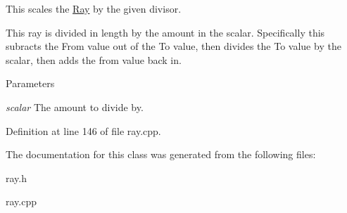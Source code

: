 This scales the \hyperlink{classphys_1_1Ray}{Ray} by the given divisor. 

This ray is divided in length by the amount in the scalar. Specifically this subracts the From value out of the To value, then divides the To value by the scalar, then adds the from value back in. 
\begin{DoxyParams}{Parameters}
\item[{\em scalar}]The amount to divide by. \end{DoxyParams}


Definition at line 146 of file ray.cpp.



The documentation for this class was generated from the following files:\begin{DoxyCompactItemize}
\item 
ray.h\item 
ray.cpp\end{DoxyCompactItemize}

